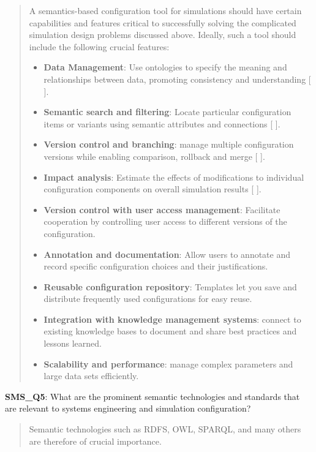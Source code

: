             \begin{quote}
                A semantics-based configuration tool for simulations should have certain capabilities and features critical to successfully solving the complicated simulation design problems discussed above. Ideally, such a tool should include the following crucial features:
                \begin{itemize}
                    \item \textbf{Data Management}: Use ontologies to specify the meaning and relationships between data, promoting consistency and understanding [ ].
                    \item \textbf{Semantic search and filtering}: Locate particular configuration items or variants using semantic attributes and connections [ ].
                    \item \textbf{Version control and branching}: manage multiple configuration versions while enabling comparison, rollback and merge [ ].
                    \item \textbf{Impact analysis}: Estimate the effects of modifications to individual configuration components on overall simulation results [ ].
                    \item \textbf{Version control with user access management}: Facilitate cooperation by controlling user access to different versions of the configuration.
                    \item \textbf{Annotation and documentation}: Allow users to annotate and record specific configuration choices and their justifications.
                    \item \textbf{Reusable configuration repository}: Templates let you save and distribute frequently used configurations for easy reuse.
                    \item \textbf{Integration with knowledge management systems}: connect to existing knowledge bases to document and share best practices and lessons learned.
                    \item \textbf{Scalability and performance}: manage complex parameters and large data sets efficiently.\\
                \end{itemize}
            \end{quote}

            \textbf{SMS\_Q5}: What are the prominent semantic technologies and standards that are relevant to systems engineering and simulation configuration?
            \begin{quote}
                Semantic technologies such as RDFS, OWL, SPARQL, and many others are therefore of crucial importance.\\
            \end{quote}


